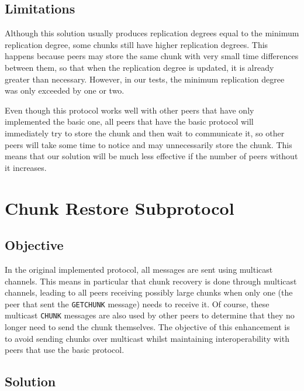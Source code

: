 \documentclass[11pt,a4paper,reqno]{report}
\numberwithin{equation}{section}
\begin{document}
\section{Limitations}

Although this solution usually produces replication degrees equal to the minimum replication degree, some chunks still have higher replication degrees. This happens because peers may store the same chunk with very small time differences between them, so that when the replication degree is updated, it is already greater than necessary. However, in our tests, the minimum replication degree was only exceeded by one or two.

Even though this protocol works well with other peers that have only implemented the basic one, all peers that have the basic protocol will immediately try to store the chunk and then wait to communicate it, so other peers will take some time to notice and may unnecessarily store the chunk. This means that our solution will be much less effective if the number of peers without it increases.



\chapter{Chunk Restore Subprotocol}

\section{Objective}

In the original implemented protocol, all messages are sent using multicast channels. This means in particular that chunk recovery is done through multicast channels, leading to all peers receiving possibly large chunks when only one (the peer that sent the \verb!GETCHUNK! message) needs to receive it. Of course, these multicast \verb!CHUNK! messages are also used by other peers to determine that they no longer need to send the chunk themselves. The objective of this enhancement is to avoid sending chunks over multicast whilst maintaining interoperability with peers that use the basic protocol. 

\section{Solution}
\end{document}

